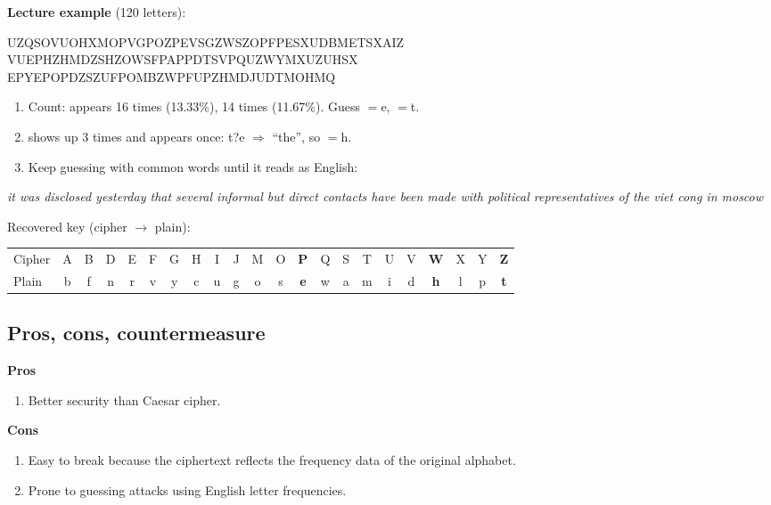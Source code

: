 \textbf{Lecture example} (120 letters):
\begin{center}\small\ttfamily
UZQSOVUOHXMOPVGPOZPEVSGZWSZOPFPESXUDBMETSXAIZ\\
VUEPHZHMDZSHZOWSFPAPPDTSVPQUZWYMXUZUHSX\\
EPYEPOPDZSZUFPOMBZWPFUPZHMDJUDTMOHMQ
\end{center}
\begin{enumerate}[leftmargin=1.5em]
  \item Count:  appears 16 times (13.33\%),  14 times (11.67\%). Guess $=$e, $=$t.
  \item {} shows up 3 times and  appears once: t?e $\Rightarrow$ ``the'', so $=$h.
  \item Keep guessing with common words until it reads as English:
\end{enumerate}
\begin{center}\small
\emph{it was disclosed yesterday that several informal but direct contacts have been made with political representatives of the viet cong in moscow}
\end{center}
Recovered key (cipher $\to$ plain):
\begin{center}\small\setlength{\tabcolsep}{2.6pt}
\begin{tabular}{@{}l*{21}{c}@{}}
\toprule
Cipher & A&B&D&E&F&G&H&I&J&M&O&\textbf{P}&Q&S&T&U&V&\textbf{W}&X&Y&\textbf{Z}\\
Plain  & b&f&n&r&v&y&c&u&g&o&s&\textbf{e}&w&a&m&i&d&\textbf{h}&l&p&\textbf{t}\\
\bottomrule
\end{tabular}
\end{center}

\subsection{Pros, cons, countermeasure}
\begin{minipage}[t]{0.3\textwidth}
\textbf{Pros}
\begin{enumerate}[leftmargin=1.5em]
  \item Better security than Caesar cipher.
\end{enumerate}
\end{minipage}\hfill
\begin{minipage}[t]{0.66\textwidth}
\textbf{Cons}
\begin{enumerate}[leftmargin=1.5em]
  \item Easy to break because the ciphertext reflects the frequency data of the original alphabet.
  \item Prone to guessing attacks using English letter frequencies.
\end{enumerate}
\end{minipage}


